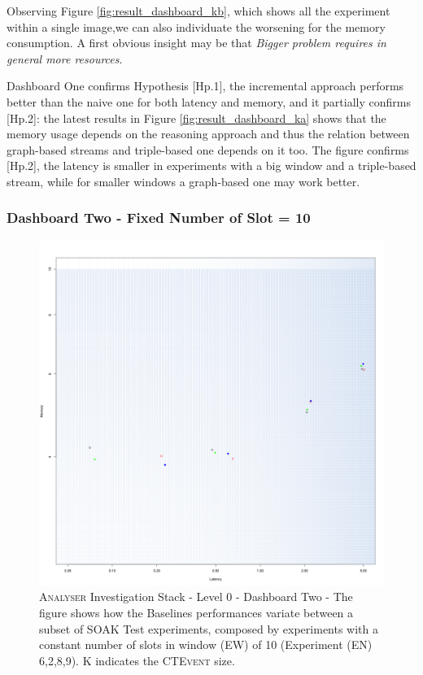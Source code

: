 Observing Figure \ref{fig:result_dashboard_kb}, which shows all the experiment within a single image,we can also individuate the worsening for the memory consumption. A first obvious insight may be that \textit{Bigger problem requires in general more resources}. %

Dashboard One confirms Hypothesis [Hp.1], the incremental approach performs better than the naive one for both latency and memory, and it partially confirms  [Hp.2]: the latest results in Figure \ref{fig:result_dashboard_ka} shows that the memory usage depends on the reasoning approach and thus the relation between graph-based streams and triple-based one depends on it too. The figure confirms [Hp.2], the latency is smaller in experiments with a big window and a triple-based stream, while for smaller windows a graph-based one may work better.


\subsubsection{Dashboard Two - Fixed Number of Slot = 10}


\begin{figure}[h!tbp]
	\centering
	\includegraphics[width=0.85\linewidth]{images/dashboard-2}	
	\caption[\textsc{Analyser} Investigation Stack - Level 0 - Dashboard Two - Multiplot Version]{\textsc{Analyser} Investigation Stack - Level 0 - Dashboard Two - The figure shows how the Baselines performances variate between a subset of SOAK Test experiments, composed by experiments with a constant number of slots in window (EW) of 10 (Experiment (EN) 6,2,8,9). K indicates the \textsc{CTEvent} size.} 	
	
	\label{fig:result_dashboard_ewb}
\end{figure}

